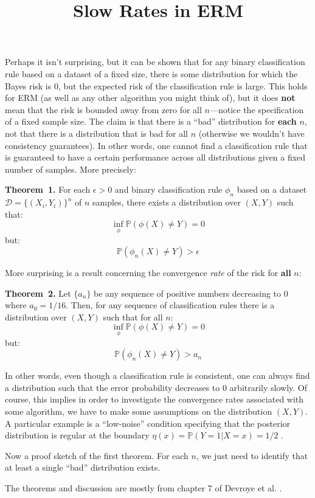 \documentclass[12pt]{article}
\title{Slow Rates in ERM}
\newenvironment{theorem}[1][]{\par\medskip
   \noindent \textbf{Theorem~#1.} \rmfamily}{\medskip}
\begin{document}
\maketitle

Perhaps it isn't surprising, but it can be shown that for any
binary classification rule based on a dataset of a fixed size, there
is some distribution for which the Bayes risk is $0$, but the expected risk of
the classification rule is large. This holds for ERM (as well as any other
algorithm you might think of), but it does \textbf{not} mean that the risk is
bounded away from zero for all $n$---notice the specification of a fixed
sample size. The claim is that there is a ``bad'' distribution for
\textbf{each} $n$, not that there is a distribution that is bad
for all $n$ (otherwise we wouldn't have consistency guarantees). In
other words, one cannot find a classification rule that is guaranteed
to have a certain performance across all distributions given a fixed
number of samples. More precisely:

\begin{theorem}[1]
  For each $\epsilon > 0$ and binary classification rule $\phi_n$ based on a dataset \(\mathcal{D} =
  \{(X_i, Y_i)\}^n\) of $n$ samples, there exists a distribution over
  $(X, Y)$ such that:
  \[\inf_\phi\mathbb{P}(\phi(X) \neq Y) = 0\]
  but:
  \[\mathbb{P}(\phi_n(X) \neq Y) > \epsilon\]

\end{theorem}

More surprising is a result concerning the convergence \textit{rate}
of the risk for \textbf{all} $n$:

\begin{theorem}[2]
  Let $\{a_n\}$ be any sequence of positive numbers decreasing to $0$
  where $a_0=1/16$. Then, for any sequence of classification rules
  there is a distribution over $(X, Y)$ such that for all $n$:
  \[\inf_\phi\mathbb{P}(\phi(X) \neq Y) = 0\]
  but:
  \[\mathbb{P}(\phi_n(X) \neq Y) > a_n\]
\end{theorem}

In other words, even though a classification rule is consistent, one
can always find a distribution such that the error probability
decreases to $0$ arbitrarily slowly. Of course, this implies in order
to investigate the convergence rates associated with some algorithm,
we have to make some assumptions on the distribution $(X, Y)$. A
particular example is a ``low-noise'' condition specifying that the
posterior distribution is regular at the boundary $\eta(x) =
\mathbb{P}(Y =1 | X=x) = 1/2$ \cite{bartlett-2006-risk}.

Now a proof sketch of the first theorem. For each $n$, we just need to
identify that at least a single ``bad'' distribution exists.

The theorems and discussion are mostly from chapter 7 of Devroye et
al. \cite{devroye-1996-pattern}.



\end{document}

